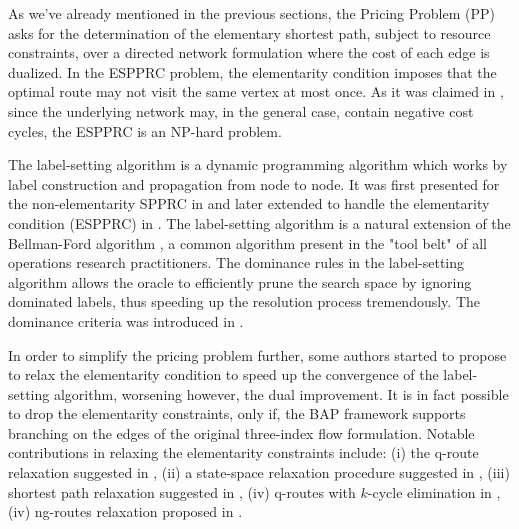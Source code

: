 As we've already mentioned in the previous sections, the Pricing Problem (PP)
asks for the determination of the elementary shortest path,
subject to resource constraints,
over a directed network formulation where the cost of each edge
is dualized.
In the ESPPRC problem, the elementarity condition imposes
that the optimal route may not visit the same vertex at most once.
As it was claimed in \textcite{dror1994},
since the underlying network may,
in the general case,
contain negative cost cycles,
the ESPPRC is an NP-hard problem.

\medskip

The label-setting algorithm is a dynamic programming
algorithm which works by label construction and propagation
from node to node.
It was first presented for the non-elementarity SPPRC in \textcite{desrosiers1983, desrochers1992}
and later extended to handle the elementarity condition (ESPPRC) in \textcite{feillet2004}.
The label-setting algorithm
is a natural extension of the Bellman-Ford algorithm \parencite{bellman1958, fordjr1956},
a common algorithm present in the "tool belt" of all operations research practitioners.
The dominance rules in the label-setting algorithm allows the oracle
to efficiently prune the search space by ignoring dominated labels, thus speeding
up the resolution process tremendously.
The dominance criteria was introduced in \cite{feillet2004}.

\medskip

In order to simplify the pricing problem further,
some authors started to propose to relax the elementarity condition
to speed up the convergence of the label-setting algorithm, worsening however, the dual improvement.
It is in fact possible to drop the elementarity constraints, only if, the BAP framework supports
branching on the edges of the original three-index flow formulation.
Notable contributions in relaxing the elementarity constraints include:
(i) the q-route relaxation suggested in \textcite{christofides1981},
(ii) a state-space relaxation procedure suggested in \textcite{christofides1981a},
(iii) shortest path relaxation suggested in \textcite{desrosiers1984},
(iv) q-routes with $k$-cycle elimination in \textcite{irnich2006},
(iv) ng-routes relaxation proposed in \textcite{baldacci2011}.

